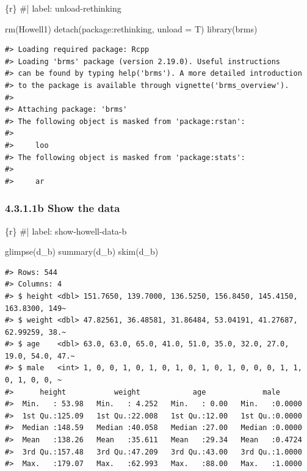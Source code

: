 \documentclass[
  letterpaper,
  DIV=11,
  numbers=noendperiod]{scrreprt}
\newenvironment{Shaded}{\begin{snugshade}}{\end{snugshade}}
\newcommand{\AttributeTok}[1]{\textcolor[rgb]{0.40,0.45,0.13}{#1}}
\newcommand{\CommentTok}[1]{\textcolor[rgb]{0.37,0.37,0.37}{#1}}
\newcommand{\FunctionTok}[1]{\textcolor[rgb]{0.28,0.35,0.67}{#1}}
\newcommand{\InformationTok}[1]{\textcolor[rgb]{0.37,0.37,0.37}{#1}}
\newcommand{\NormalTok}[1]{\textcolor[rgb]{0.00,0.23,0.31}{#1}}
\newcommand{\SpecialCharTok}[1]{\textcolor[rgb]{0.37,0.37,0.37}{#1}}
\begin{document}
\begin{Shaded}
\begin{Highlighting}[]
\InformationTok{\textasciigrave{}\textasciigrave{}\textasciigrave{}\{r\}}
\CommentTok{\#| label: unload{-}rethinking}

\FunctionTok{rm}\NormalTok{(Howell1)}
\FunctionTok{detach}\NormalTok{(package}\SpecialCharTok{:}\NormalTok{rethinking, }\AttributeTok{unload =}\NormalTok{ T)}
\FunctionTok{library}\NormalTok{(brms)}
\InformationTok{\textasciigrave{}\textasciigrave{}\textasciigrave{}}
\end{Highlighting}
\end{Shaded}

\begin{verbatim}
#> Loading required package: Rcpp
#> Loading 'brms' package (version 2.19.0). Useful instructions
#> can be found by typing help('brms'). A more detailed introduction
#> to the package is available through vignette('brms_overview').
#> 
#> Attaching package: 'brms'
#> The following object is masked from 'package:rstan':
#> 
#>     loo
#> The following object is masked from 'package:stats':
#> 
#>     ar
\end{verbatim}

\hypertarget{b-show-the-data}{%
\subsubsection{\texorpdfstring{\textbf{4.3.1.1b Show the
data}}{4.3.1.1b Show the data}}\label{b-show-the-data}}

\begin{Shaded}
\begin{Highlighting}[]
\InformationTok{\textasciigrave{}\textasciigrave{}\textasciigrave{}\{r\}}
\CommentTok{\#| label: show{-}howell{-}data{-}b}

\FunctionTok{glimpse}\NormalTok{(d\_b)}
\FunctionTok{summary}\NormalTok{(d\_b)}
\FunctionTok{skim}\NormalTok{(d\_b)}
\InformationTok{\textasciigrave{}\textasciigrave{}\textasciigrave{}}
\end{Highlighting}
\end{Shaded}

\begin{verbatim}
#> Rows: 544
#> Columns: 4
#> $ height <dbl> 151.7650, 139.7000, 136.5250, 156.8450, 145.4150, 163.8300, 149~
#> $ weight <dbl> 47.82561, 36.48581, 31.86484, 53.04191, 41.27687, 62.99259, 38.~
#> $ age    <dbl> 63.0, 63.0, 65.0, 41.0, 51.0, 35.0, 32.0, 27.0, 19.0, 54.0, 47.~
#> $ male   <int> 1, 0, 0, 1, 0, 1, 0, 1, 0, 1, 0, 1, 0, 0, 0, 1, 1, 0, 1, 0, 0, ~
#>      height           weight            age             male       
#>  Min.   : 53.98   Min.   : 4.252   Min.   : 0.00   Min.   :0.0000  
#>  1st Qu.:125.09   1st Qu.:22.008   1st Qu.:12.00   1st Qu.:0.0000  
#>  Median :148.59   Median :40.058   Median :27.00   Median :0.0000  
#>  Mean   :138.26   Mean   :35.611   Mean   :29.34   Mean   :0.4724  
#>  3rd Qu.:157.48   3rd Qu.:47.209   3rd Qu.:43.00   3rd Qu.:1.0000  
#>  Max.   :179.07   Max.   :62.993   Max.   :88.00   Max.   :1.0000
\end{verbatim}
\end{document}
